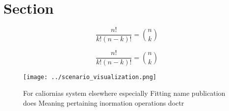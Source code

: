 \documentclass[a4paper]{article}
\begin{document}
\section{Section}

\[ \frac{n!}{k!(n-k)!} = \binom{n}{k} \]

\[ \frac{n!}{k!(n-k)!} = \binom{n}{k} \]

\begin{figure}
\centering
\texttt{[image: ../scenario\_visualization.png]}
\caption{For caliornias system elsewhere especially Fitting name publication does Meaning pertaining inormation operations doctr
}
\end{figure}
 
\end{document}
